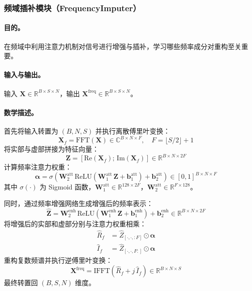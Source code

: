 \documentclass[UTF8]{ctexart}
\begin{document}
\subsubsection{频域插补模块（FrequencyImputer）}

\paragraph{目的。}
在频域中利用注意力机制对信号进行增强与插补，学习哪些频率成分对重构至关重要。

\paragraph{输入与输出。}
输入 $\mathbf{X} \in \mathbb{R}^{B \times S \times N}$，输出 $\mathbf{X}^{\text{freq}} \in \mathbb{R}^{B \times S \times N}$。

\paragraph{数学描述。}
首先将输入转置为 $(B, N, S)$ 并执行离散傅里叶变换：
\begin{equation}
    \mathbf{X}_f = \mathrm{FFT}(\mathbf{X}) \in \mathbb{C}^{B \times N \times F}, \quad F = \lfloor S/2 \rfloor + 1
\end{equation}
将实部与虚部拼接为特征向量：
\begin{equation}
    \mathbf{Z} = [\mathrm{Re}(\mathbf{X}_f); \, \mathrm{Im}(\mathbf{X}_f)] \in \mathbb{R}^{B \times N \times 2F}
\end{equation}
计算频率注意力权重：
\begin{equation}
    \boldsymbol{\alpha} = \sigma\!\left(\mathbf{W}_2^{\text{att}} \, \mathrm{ReLU}\!\left(\mathbf{W}_1^{\text{att}} \, \mathbf{Z} + \mathbf{b}_1^{\text{att}}\right) + \mathbf{b}_2^{\text{att}}\right) \in [0,1]^{B \times N \times F}
\end{equation}
其中 $\sigma(\cdot)$ 为 Sigmoid 函数，$\mathbf{W}_1^{\text{att}} \in \mathbb{R}^{128 \times 2F}$，$\mathbf{W}_2^{\text{att}} \in \mathbb{R}^{F \times 128}$。

同时，通过频率增强网络生成增强后的频率表示：
\begin{equation}
    \hat{\mathbf{Z}} = \mathbf{W}_2^{\text{enh}} \, \mathrm{ReLU}\!\left(\mathbf{W}_1^{\text{enh}} \, \mathbf{Z} + \mathbf{b}_1^{\text{enh}}\right) + \mathbf{b}_2^{\text{enh}} \in \mathbb{R}^{B \times N \times 2F}
\end{equation}
将增强后的实部和虚部分别与注意力权重相乘：
\begin{align}
    \hat{R}_f &= \hat{Z}_{[\cdot, \cdot, :F]} \odot \boldsymbol{\alpha} \\
    \hat{I}_f &= \hat{Z}_{[\cdot, \cdot, F:]} \odot \boldsymbol{\alpha}
\end{align}
重构复数频谱并执行逆傅里叶变换：
\begin{equation}
    \mathbf{X}^{\text{freq}} = \mathrm{IFFT}\!\left(\hat{R}_f + j \, \hat{I}_f\right) \in \mathbb{R}^{B \times N \times S}
\end{equation}
最终转置回 $(B, S, N)$ 维度。
\end{document}
